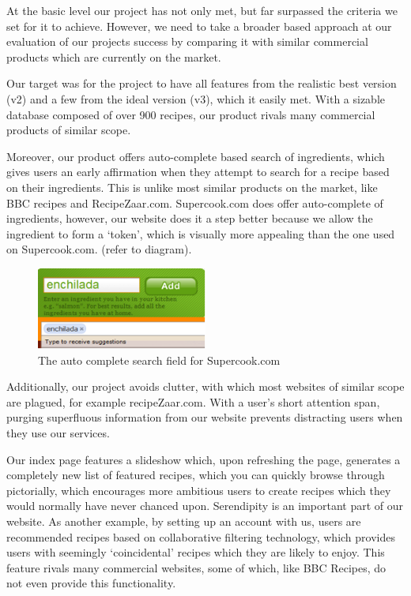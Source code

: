 At the basic level our project has not only met, but far surpassed the criteria we set for it to achieve. However, we need to take a broader based approach at our evaluation of our projects success by comparing it with similar commercial products which are currently on the market. 

Our target was for the project to have all features from the realistic best version (v2) and a few from the ideal version (v3), which it easily met.  With a sizable database composed of over 900 recipes, our product rivals many commercial products of similar scope.

Moreover, our product offers auto-complete based search of ingredients, which gives users an early affirmation when they attempt to search for a recipe based on their ingredients. This is unlike most similar products on the market, like BBC recipes and RecipeZaar.com. Supercook.com does offer auto-complete of ingredients, however, our website does it a step better because we allow the ingredient to form a `token', which is visually more appealing than the one used on Supercook.com. (refer to diagram).

\begin{figure}[h]
\begin{center}
\includegraphics[width=0.5\textwidth]{autocomplete}
\caption{The auto complete search field for Supercook.com }
\end{center}
\end{figure}

Additionally, our project avoids clutter, with which most websites of similar scope are plagued, for example recipeZaar.com. With a user's short attention span, purging superfluous information from our website prevents distracting users when they use our services.

Our index page features a slideshow which, upon refreshing the page, generates a completely new list of featured recipes, which you can quickly browse through pictorially, which encourages more ambitious users to create recipes which they would normally have never chanced upon. Serendipity is an important part of our website.  As another example, by setting up an account with us, users are recommended recipes based on collaborative filtering technology, which provides users with seemingly `coincidental' recipes which they are likely to enjoy. This feature rivals many commercial websites, some of which, like BBC Recipes, do not even provide this functionality.

